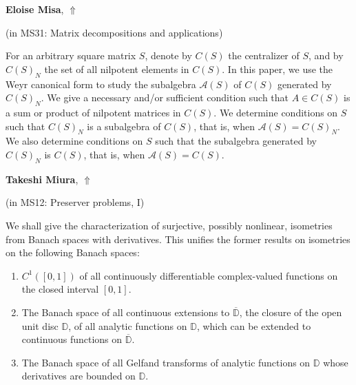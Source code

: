 \documentclass[ILAS2025-program.tex]{subfiles}
\begin{document}
     \hypertarget{down0275}{}\begin{ilasabstract}
    
    \textbf{Eloise Misa},  \hfill \hyperlink{up0275}{$\Uparrow$}
    
    (in {\color{mstitle}MS31: Matrix decompositions and applications})
        
        \mtskip
    For an arbitrary square matrix $S$, denote by $C(S)$ the centralizer of $S$, and by $C(S)_N$ the set of all nilpotent elements in $C(S)$.
In this paper, we use the Weyr canonical form to study the subalgebra $\mathcal{A}(S)$ of $C(S)$ generated by $C(S)_N$. We give a necessary and/or sufficient condition such that $A \in C(S)$ is a sum or product of nilpotent matrices in $C(S)$. We determine conditions on $S$ such that $C(S)_N$ is a subalgebra of $C(S)$, that is, when $\mathcal{A}(S)=C(S)_N$. We also determine conditions on $S$ such that the subalgebra generated by $C(S)_N$ is $C(S)$, that is, when $\mathcal{A}(S)=C(S)$.\end{ilasabstract}
     \hypertarget{down0164}{}\begin{ilasabstract}
    
    \textbf{Takeshi Miura},  \hfill \hyperlink{up0164}{$\Uparrow$}
    
    (in {\color{mstitle}MS12: Preserver problems, I})
        
        \mtskip
    We shall give the characterization of surjective, possibly nonlinear,
isometries from Banach spaces with derivatives.
This unifies the former results on isometries on the following
Banach spaces:
\begin{enumerate}
\item
$C^1([0,1])$ of all continuously differentiable complex-valued functions
on the closed interval $[0,1]$.

\item
The Banach space of all continuous extensions to $\overline{\mathbb{D}}$,
the closure of the open unit disc $\mathbb{D}$,
of all analytic functions on $\mathbb{D}$,
which can be extended to continuous functions on $\overline{\mathbb{D}}$.

\item
The Banach space of all Gelfand transforms of analytic functions
on $\mathbb{D}$ whose derivatives are bounded on $\mathbb{D}$.
\end{enumerate}
\end{ilasabstract}
\end{document}
